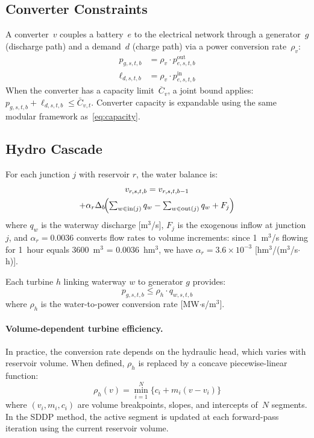 \subsection{Converter Constraints}

A converter~$v$ couples a battery~$e$ to the electrical network through
a generator~$g$ (discharge path) and a demand~$d$ (charge path) via a
power conversion rate~$\rho_v$:
\begin{align}
\label{eq:conv_discharge}
p_{g,s,t,b} &= \rho_v \cdot p^\text{out}_{e,s,t,b} \\
\label{eq:conv_charge}
\ell_{d,s,t,b} &= \rho_v \cdot p^\text{in}_{e,s,t,b}
\end{align}
When the converter has a capacity limit~$\overline{C}_v$, a joint bound
applies: $p_{g,s,t,b} + \ell_{d,s,t,b} \leq \bar{C}_{v,t}$.
Converter capacity is expandable using the same modular framework
as~\eqref{eq:capacity}.

\subsection{Hydro Cascade}
\label{sec:hydro}

For each junction $j$ with reservoir $r$, the water balance is:
\begin{multline}
\label{eq:hydro_balance}
v_{r,s,t,b} = v_{r,s,t,b-1} \\
  + \alpha_r \Delta_b \!\Bigl(
    \textstyle\sum_{w \in \text{in}(j)} q_{w}
    - \textstyle\sum_{w \in \text{out}(j)} q_{w}
    + F_j
  \Bigr)
\end{multline}
where $q_w$ is the waterway discharge [m$^3$/s], $F_j$ is the exogenous
inflow at junction $j$, and $\alpha_r = 0.0036$ converts flow rates to
volume increments: since 1~m$^3$/s flowing for 1~hour equals
3600~m$^3$ = 0.0036~hm$^3$, we have $\alpha_r = 3.6 \times 10^{-3}$
[hm$^3$/(m$^3$/s$\cdot$h)].

Each turbine $h$ linking waterway $w$ to generator $g$ provides:
\begin{equation}
\label{eq:turbine}
p_{g,s,t,b} \leq \rho_h \cdot q_{w,s,t,b}
\end{equation}
where $\rho_h$ is the water-to-power conversion rate [MW$\cdot$s/m$^3$].

\paragraph{Volume-dependent turbine efficiency.}
In practice, the conversion rate depends on the hydraulic head, which
varies with reservoir volume.  When defined, $\rho_h$ is replaced by a
concave piecewise-linear function:
\begin{equation}
\label{eq:vol_efficiency}
\rho_h(v) = \min_{i=1}^{N}
  \bigl\{ c_i + m_i (v - v_i) \bigr\}
\end{equation}
where $(v_i, m_i, c_i)$ are volume breakpoints, slopes, and intercepts
of~$N$ segments.  In the SDDP method, the active segment is updated at
each forward-pass iteration using the current reservoir volume.


